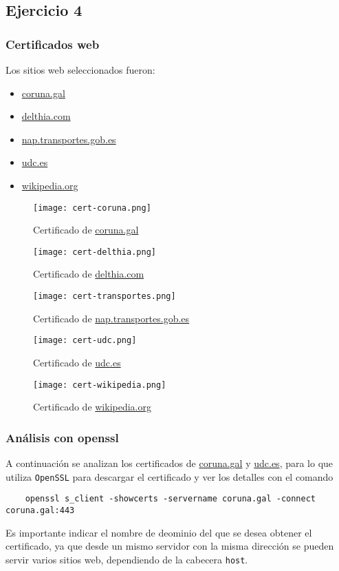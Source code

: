 \subsection{Ejercicio 4}
\graphicspath{ {img/4} }

\subsubsection{Certificados web}

Los sitios web seleccionados fueron:
\begin{itemize}
    \item \href{https://www.coruna.gal}{coruna.gal}
    \item \href{https://delthia.com}{delthia.com}
    \item \href{https://nap.transportes.gob.es}{nap.transportes.gob.es}
    \item \href{https://www.udc.es}{udc.es}
    \item \href{www.wikipedia.org}{wikipedia.org}
\end{itemize}

\begin{figure}[ht]
    \texttt{[image: cert-coruna.png]}
    \caption{Certificado de \url{coruna.gal}}
\end{figure}

\begin{figure}[ht]
    \texttt{[image: cert-delthia.png]}
    \caption{Certificado de \url{delthia.com}}
\end{figure}

\begin{figure}[ht]
    \texttt{[image: cert-transportes.png]}
    \caption{Certificado de \url{nap.transportes.gob.es}}
\end{figure}

\begin{figure}[ht]
    \texttt{[image: cert-udc.png]}
    \caption{Certificado de \url{udc.es}}
\end{figure}

\begin{figure}[ht]
    \texttt{[image: cert-wikipedia.png]}
    \caption{Certificado de \url{wikipedia.org}}
\end{figure}

\subsubsection{Análisis con openssl}

A continuación se analizan los certificados de \url{coruna.gal} y \url{udc.es}, para lo que utiliza \texttt{OpenSSL} para descargar el certificado y ver los detalles con el comando

\begin{lstlisting}
    openssl s_client -showcerts -servername coruna.gal -connect coruna.gal:443
\end{lstlisting}

Es importante indicar el nombre de deominio del que se desea obtener el certificado, ya que desde un mismo servidor con la misma dirección se pueden servir varios sitios web, dependiendo de la cabecera \texttt{host}.
